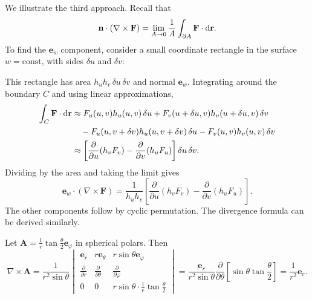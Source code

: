 \documentclass[a4paper]{article}
\begin{document}
\begin{eg}
  We illustrate the third approach. Recall that
  \[
    \mathbf{n}\cdot (\nabla \times \mathbf{F}) = \lim_{A \to 0}\frac{1}{A}\int_{\partial A}\mathbf{F}\cdot \mathrm{d} \mathbf{r}.
  \]
  To find the $\mathbf{e}_w$ component, consider a small coordinate rectangle in the surface $w = \text{const}$, with sides $\delta u$ and $\delta v$:
  \begin{center}
  \end{center}
  This rectangle has area $h_u h_v \,\delta u\,\delta v$ and normal $\mathbf{e}_w$. Integrating around the boundary $C$ and using linear approximations,
  \begin{align*}
    \int_C \mathbf{F}\cdot \mathrm{d} \mathbf{r} &\approx F_u(u, v) h_u(u, v)\,\delta u + F_v(u + \delta u, v) h_v(u + \delta u, v)\,\delta v \\
    &\quad - F_u(u, v + \delta v)h_u (u, v + \delta v)\, \delta u - F_v(u, v)h_v(u, v)\,\delta v\\
    &\approx \left[\frac{\partial}{\partial u}(h_vF_v) - \frac{\partial}{\partial v}(h_uF_u)\right]\delta u\,\delta v.
  \end{align*}
  Dividing by the area and taking the limit gives
  \[
    \mathbf{e}_w\cdot (\nabla\times \mathbf{F}) = \frac{1}{h_uh_v}\left[\frac{\partial }{\partial u}(h_vF_v) - \frac{\partial }{\partial v}(h_uF_u)\right].
  \]
  The other components follow by cyclic permutation. The divergence formula can be derived similarly.
\end{eg}

\begin{eg}
  Let $\mathbf{A} = \frac{1}{r}\tan \frac{\theta}{2} \mathbf{e}_\varphi$ in spherical polars. Then
  \[
    \nabla\times \mathbf{A} = \frac{1}{r^2\sin \theta}
    \begin{vmatrix}
      \mathbf{e}_r & r\mathbf{e}_\theta & r\sin \theta \mathbf{e}_\varphi\\
      \frac{\partial}{\partial r} & \frac{\partial}{\partial \theta} & \frac{\partial}{\partial \varphi}\\
      0 & 0 & r\sin \theta \cdot \frac{1}{r}\tan \frac{\theta}{2}
    \end{vmatrix} = \frac{\mathbf{e}_r}{r^2\sin \theta}\frac{\partial}{\partial \theta}\left[\sin \theta\tan \frac{\theta}{2}\right] = \frac{1}{r^2}\mathbf{e}_r.
  \]
\end{eg}
\end{document}
